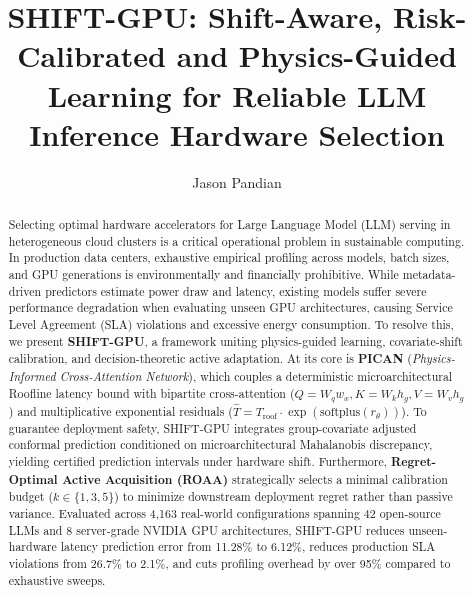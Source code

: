 \documentclass[3p,12pt]{elsarticle}
\begin{document}
\begin{frontmatter}

\title{SHIFT-GPU: Shift-Aware, Risk-Calibrated and Physics-Guided Learning for Reliable LLM Inference Hardware Selection}

\author[inst1]{Jason Pandian}



\begin{abstract}
Selecting optimal hardware accelerators for Large Language Model (LLM) serving in heterogeneous cloud clusters is a critical operational problem in sustainable computing. In production data centers, exhaustive empirical profiling across models, batch sizes, and GPU generations is environmentally and financially prohibitive. While metadata-driven predictors estimate power draw and latency, existing models suffer severe performance degradation when evaluating unseen GPU architectures, causing Service Level Agreement (SLA) violations and excessive energy consumption. To resolve this, we present \textbf{SHIFT-GPU}, a framework uniting physics-guided learning, covariate-shift calibration, and decision-theoretic active adaptation. At its core is \textbf{PICAN} (\textit{Physics-Informed Cross-Attention Network}), which couples a deterministic microarchitectural Roofline latency bound with bipartite cross-attention ($Q = W_q w_x, K = W_k h_g, V = W_v h_g$) and multiplicative exponential residuals ($\hat{T} = T_{\text{roof}} \cdot \exp(\text{softplus}(r_\theta))$). To guarantee deployment safety, SHIFT-GPU integrates group-covariate adjusted conformal prediction conditioned on microarchitectural Mahalanobis discrepancy, yielding certified prediction intervals under hardware shift. Furthermore, \textbf{Regret-Optimal Active Acquisition (ROAA)} strategically selects a minimal calibration budget ($k \in \{1, 3, 5\}$) to minimize downstream deployment regret rather than passive variance. Evaluated across 4,163 real-world configurations spanning 42 open-source LLMs and 8 server-grade NVIDIA GPU architectures, SHIFT-GPU reduces unseen-hardware latency prediction error from 11.28\% to 6.12\%, reduces production SLA violations from 26.7\% to 2.1\%, and cuts profiling overhead by over 95\% compared to exhaustive sweeps.
\end{abstract}


\end{frontmatter}
\end{document}
